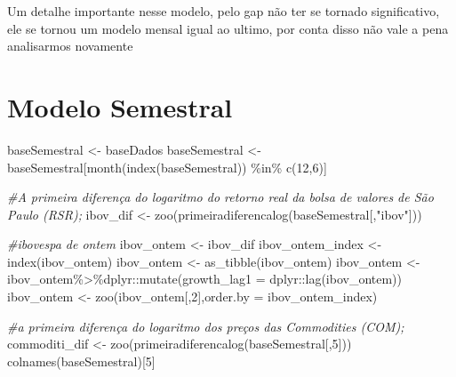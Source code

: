 \documentclass[
]{article}
\newenvironment{Shaded}{\begin{snugshade}}{\end{snugshade}}
\newcommand{\AttributeTok}[1]{\textcolor[rgb]{0.77,0.63,0.00}{#1}}
\newcommand{\CommentTok}[1]{\textcolor[rgb]{0.56,0.35,0.01}{\textit{#1}}}
\newcommand{\DecValTok}[1]{\textcolor[rgb]{0.00,0.00,0.81}{#1}}
\newcommand{\FunctionTok}[1]{\textcolor[rgb]{0.00,0.00,0.00}{#1}}
\newcommand{\NormalTok}[1]{#1}
\newcommand{\OtherTok}[1]{\textcolor[rgb]{0.56,0.35,0.01}{#1}}
\newcommand{\SpecialCharTok}[1]{\textcolor[rgb]{0.00,0.00,0.00}{#1}}
\newcommand{\StringTok}[1]{\textcolor[rgb]{0.31,0.60,0.02}{#1}}
\begin{document}
Um detalhe importante nesse modelo, pelo gap não ter se tornado
significativo, ele se tornou um modelo mensal igual ao ultimo, por conta
disso não vale a pena analisarmos novamente

\hypertarget{modelo-semestral}{%
\section{Modelo Semestral}\label{modelo-semestral}}

\begin{Shaded}
\begin{Highlighting}[]
\NormalTok{baseSemestral }\OtherTok{\textless{}{-}}\NormalTok{ baseDados}
\NormalTok{baseSemestral }\OtherTok{\textless{}{-}}\NormalTok{ baseSemestral[}\FunctionTok{month}\NormalTok{(}\FunctionTok{index}\NormalTok{(baseSemestral)) }\SpecialCharTok{\%in\%} \FunctionTok{c}\NormalTok{(}\DecValTok{12}\NormalTok{,}\DecValTok{6}\NormalTok{)]}

\CommentTok{\#A primeira diferença do logaritmo do retorno real da bolsa de valores de São Paulo (RSR);}
\NormalTok{ibov\_dif }\OtherTok{\textless{}{-}} \FunctionTok{zoo}\NormalTok{(}\FunctionTok{primeiradiferencalog}\NormalTok{(baseSemestral[,}\StringTok{"ibov"}\NormalTok{]))}

\CommentTok{\#ibovespa de ontem}
\NormalTok{ibov\_ontem }\OtherTok{\textless{}{-}}\NormalTok{ ibov\_dif}
\NormalTok{ibov\_ontem\_index }\OtherTok{\textless{}{-}} \FunctionTok{index}\NormalTok{(ibov\_ontem)}
\NormalTok{ibov\_ontem }\OtherTok{\textless{}{-}} \FunctionTok{as\_tibble}\NormalTok{(ibov\_ontem)}
\NormalTok{ibov\_ontem }\OtherTok{\textless{}{-}}\NormalTok{ ibov\_ontem}\SpecialCharTok{\%\textgreater{}\%}\NormalTok{dplyr}\SpecialCharTok{::}\FunctionTok{mutate}\NormalTok{(}\AttributeTok{growth\_lag1 =}\NormalTok{ dplyr}\SpecialCharTok{::}\FunctionTok{lag}\NormalTok{(ibov\_ontem))}
\NormalTok{ibov\_ontem }\OtherTok{\textless{}{-}} \FunctionTok{zoo}\NormalTok{(ibov\_ontem[,}\DecValTok{2}\NormalTok{],}\AttributeTok{order.by =}\NormalTok{ ibov\_ontem\_index)}

\CommentTok{\#a primeira diferença do logaritmo dos preços das Commodities (COM);}
\NormalTok{commoditi\_dif }\OtherTok{\textless{}{-}} \FunctionTok{zoo}\NormalTok{(}\FunctionTok{primeiradiferencalog}\NormalTok{(baseSemestral[,}\DecValTok{5}\NormalTok{]))}
\FunctionTok{colnames}\NormalTok{(baseSemestral)[}\DecValTok{5}\NormalTok{]}
\end{Highlighting}
\end{Shaded}
\end{document}

